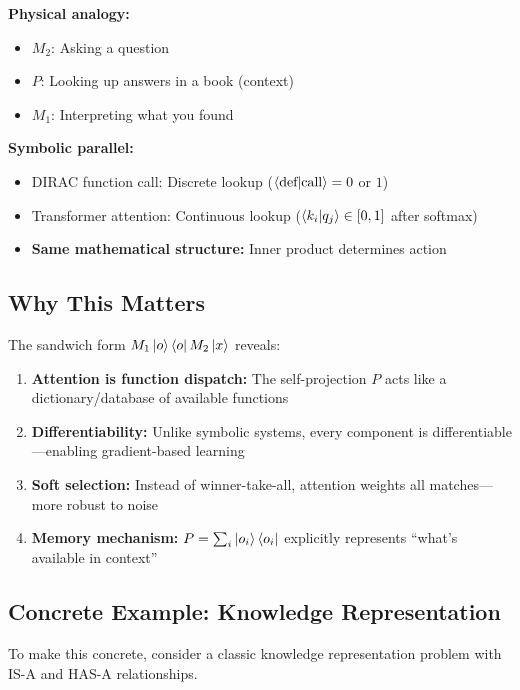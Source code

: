 \documentclass[11pt,a4paper]{article}
\theoremstyle{definition}
\begin{document}
\textbf{Physical analogy:}
\begin{itemize}
\item $M_2$: Asking a question
\item $P$: Looking up answers in a book (context)
\item $M_1$: Interpreting what you found
\end{itemize}

\textbf{Symbolic parallel:}
\begin{itemize}
\item DIRAC function call: Discrete lookup ($\braket{\text{def}|\text{call}} = 0$ or $1$)
\item Transformer attention: Continuous lookup ($\braket{k_i|q_j} \in [0,1]$ after softmax)
\item \textbf{Same mathematical structure:} Inner product determines action
\end{itemize}

\subsection{Why This Matters}

The sandwich form $M_1 \ket{o}\bra{o} M_2 \ket{x}$ reveals:

\begin{enumerate}
\item \textbf{Attention is function dispatch:} The self-projection $P$ acts like a dictionary/database of available functions

\item \textbf{Differentiability:} Unlike symbolic systems, every component is differentiable---enabling gradient-based learning

\item \textbf{Soft selection:} Instead of winner-take-all, attention weights all matches---more robust to noise

\item \textbf{Memory mechanism:} $P = \sum_i \ket{o_i}\bra{o_i}$ explicitly represents ``what's available in context''
\end{enumerate}

\subsection{Concrete Example: Knowledge Representation}

To make this concrete, consider a classic knowledge representation problem with IS-A and HAS-A relationships.
\end{document}
